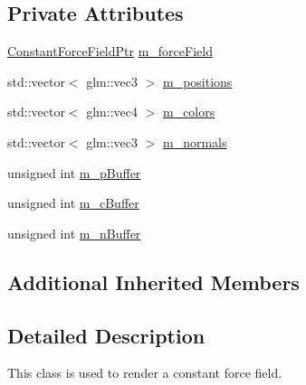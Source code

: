 \subsection*{Private Attributes}
\begin{DoxyCompactItemize}
\item 
\hyperlink{ConstantForceField_8hpp_a7b80b566be4aeb0b5474a8aeb2e0ff49}{Constant\+Force\+Field\+Ptr} \hyperlink{classConstantForceFieldRenderable_ac9613a4d0ca11522749d2416b51cf1c5}{m\+\_\+force\+Field}
\item 
std\+::vector$<$ glm\+::vec3 $>$ \hyperlink{classConstantForceFieldRenderable_adda5c978538c39f9ce237bc4914d0399}{m\+\_\+positions}
\item 
std\+::vector$<$ glm\+::vec4 $>$ \hyperlink{classConstantForceFieldRenderable_a78a6bde3ae426f7367563718573ef9e3}{m\+\_\+colors}
\item 
std\+::vector$<$ glm\+::vec3 $>$ \hyperlink{classConstantForceFieldRenderable_a171dc24ba94fd9337d36758e8791cebb}{m\+\_\+normals}
\item 
unsigned int \hyperlink{classConstantForceFieldRenderable_a170f25325d424be2a1533befc64b1648}{m\+\_\+p\+Buffer}
\item 
unsigned int \hyperlink{classConstantForceFieldRenderable_a6c7501e6c02b7c49b7ee253563000eff}{m\+\_\+c\+Buffer}
\item 
unsigned int \hyperlink{classConstantForceFieldRenderable_af160da689aab9e5b38558cc159f9f2e4}{m\+\_\+n\+Buffer}
\end{DoxyCompactItemize}
\subsection*{Additional Inherited Members}


\subsection{Detailed Description}
This class is used to render a constant force field. 

